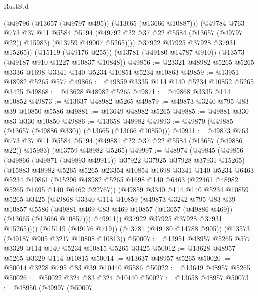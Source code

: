 \begin{lexlean}{RustStd}
\begin{coremodule}
            (@49796 (@13657 (@49797 @495)) (@13665 (@13666 @10887)))
            (@49784
              @763
              @773
              @37
              @11
              @5584
              @5194
              (@49792 @22 @37 @22 @5584 (@13657 (@49797 @22)) @15983)
              (@13759 @49007 @5265))))
        @37922
        @37925
        @37928
        @37931
        @15265))
    (@15119 (@49176 @255))
    (@13781 (@49180 @14787 @910))
    (@13573 (@49187 @910 @1227 @10837 @10848))
@49856 := @23321 @48982 @5265 @5265 @3336 @1698 @3341 @140 @5234 @10854 @5234 @10863
@49859 := @13951 @48982 @5265 @577
@49866 := @49859 @3335 @114 @140 @5234 @10852 @5265 @3425
@49868 := @13628 @48982 @5265
@49871 := @49868 @3335 @114 @10852
@49873 := @13637 @48982 @5265
@49879 := @49873 @3240 @795 @83 @39 @10850 @5586
@49881 := @13649 @48982 @5265
@49885 := @49881 @330 @83 @330 @10850
@49886 := @13658 @48982
@49893 := @49879 (@49885 (@13657 (@49886 @330)) (@13665 (@13666 @10850)))
@49911 := @49873
    @763
    @773
    @37
    @11
    @5584
    @5194
    (@49881 @22 @37 @22 @5584 (@13657 (@49886 @22)) @15983)
    (@13759 @48982 @5265)
@49997 := @48974
    (@49845
      (@49856
        (@49866 (@49871 (@49893 @49911)) @37922 @37925 @37928 @37931 @15265)
        (@15883
          @48982
          @5265
          @5265
          @23354
          @10854
          @1698
          @3341
          @140
          @5234
          @6463
          @5234
          @10861
          (@15296 @48982 @5265 @1698 @140 @6463 (@22461 @48982 @5265 @1695 @140 @6462 @22767))
          (@49859
            @3340
            @114
            @140
            @5234
            @10859
            @5265
            @3425
            (@49868
              @3340
              @114
              @10859
              (@49873
                @3242
                @795
                @83
                @39
                @10857
                @5586
                (@49881 @469 @83 @469 @10857 (@13657 (@49886 @469)) (@13665 (@13666 @10857)))
                @49911))
            @37922
            @37925
            @37928
            @37931
            @15265))))
    (@15119 (@49176 @719))
    (@13781 (@49180 @14788 @905))
    (@13573 (@49187 @905 @3217 @10808 @10813))
@50007 := @13951 @48957 @5265 @577 @3329 @114 @140 @5234 @10815 @5265 @3425
@50012 := @13628 @48957 @5265 @3329 @114 @10815
@50014 := @13637 @48957 @5265
@50020 := @50014 @3228 @795 @83 @39 @10440 @5586
@50022 := @13649 @48957 @5265
@50026 := @50022 @324 @83 @324 @10440
@50027 := @13658 @48957
@50073 := @48950
    (@49997
      (@50007

\end{coremodule}
\end{lexlean}

